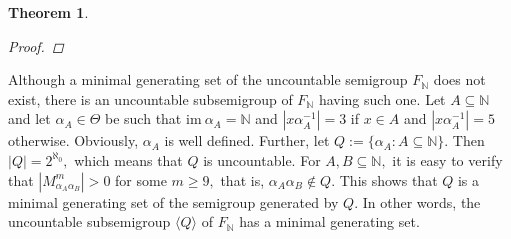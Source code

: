 \documentclass[11pt]{article}
\theoremstyle{plain}
\newtheorem{theorem}{Theorem}[section]
\theoremstyle{definition}
\newcommand{\im}{\mathrm{im~}}
\begin{document}
\begin{theorem}
\begin{proof}
\end{proof}
\end{theorem}
Although a minimal generating set of the uncountable semigroup $F_{\mathbb{N}}$ does not exist, there is an uncountable subsemigroup of $F_{\mathbb{N}}$ having such one. Let $A\subseteq\mathbb{N}$ and let $\alpha_{A}\in\Theta$ be such that  $\im\alpha_{A}=\mathbb{N}$ and $\left\vert x\alpha_{A}^{-1} \right\vert=3$ if $x\in A$ and $\left\vert x\alpha_{A}^{-1} \right\vert=5$ otherwise. Obviously, $\alpha_{A}$ is well defined. Further, let $Q:=\{\alpha_{A}: A\subseteq\mathbb{N}\}.$ Then $\left\vert Q\right\vert=2^{\aleph_{0}},$ which means that $Q$ is uncountable. For $A,B\subseteq\mathbb{N},$ it is easy to verify that $\left\vert M_{\alpha_{A}\alpha_{B}}^{m}\right\vert>0$ for some $m\geq 9,$ that is, $\alpha_{A}\alpha_{B}\not\in Q.$ This shows that $Q$ is a minimal generating set of the semigroup generated by $Q.$ In other words, the uncountable subsemigroup $\langle Q\rangle$ of $F_{\mathbb{N}}$ has a minimal generating set. 
 
\end{document}

